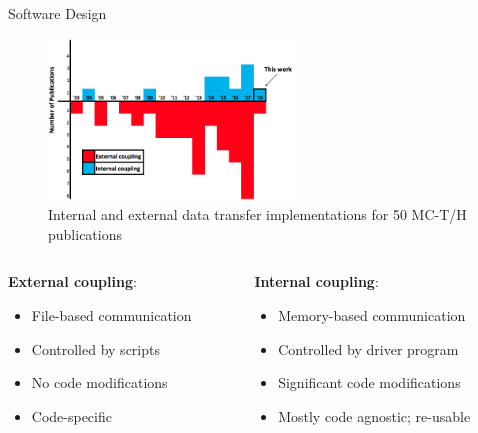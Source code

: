 \documentclass[10pt]{beamer}
\begin{document}
\begin{frame}{Software Design}

\begin{figure}
\includegraphics[width=6.5cm]{../Figures/internal_vs_external.png}
\caption{Internal and external data transfer implementations for 50 MC-T/H publications}
\end{figure}

\begin{columns}[t]
\begin{column}{0.485\linewidth}
\color{red}\textbf{External coupling}\color{black}:
	\begin{itemize}
	\item File-based communication
	\item Controlled by scripts
	\item No code modifications
	\item Code-specific\newline
	\end{itemize}
\end{column}
\begin{column}{0.485\linewidth}
\color{cyan}\textbf{Internal coupling}\color{black}:
	\begin{itemize}
	\item Memory-based communication
	\item Controlled by driver program
	\item Significant code modifications
	\item Mostly code agnostic; re-usable
	\end{itemize}
\end{column}
\end{columns}
\end{frame}
\end{document}
